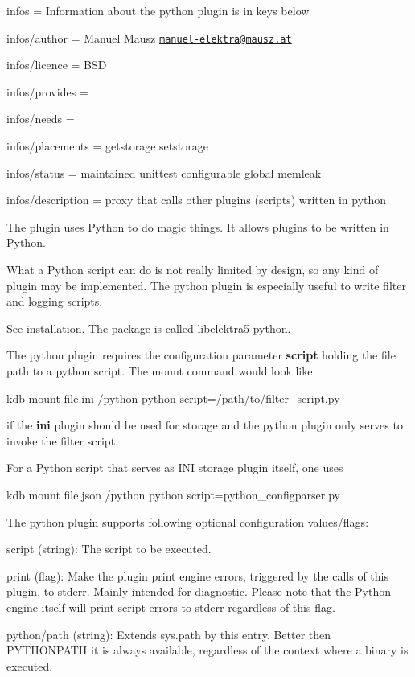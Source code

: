 
\begin{DoxyItemize}
\item infos = Information about the python plugin is in keys below
\item infos/author = Manuel Mausz \href{mailto:manuel-elektra@mausz.at}{\tt manuel-\/elektra@mausz.\+at}
\item infos/licence = B\+SD
\item infos/provides =
\item infos/needs =
\item infos/placements = getstorage setstorage
\item infos/status = maintained unittest configurable global memleak
\item infos/description = proxy that calls other plugins (scripts) written in python
\end{DoxyItemize}

The plugin uses Python to do magic things. It allows plugins to be written in Python.

What a Python script can do is not really limited by design, so any kind of plugin may be implemented. The python plugin is especially useful to write filter and logging scripts.

See \hyperlink{doc_INSTALL_md}{installation}. The package is called {\ttfamily libelektra5-\/python}.

The python plugin requires the configuration parameter {\bfseries script} holding the file path to a python script. The mount command would look like


\begin{DoxyCode}
kdb mount file.ini /python python script=/path/to/filter\_script.py
\end{DoxyCode}


if the {\bfseries ini} plugin should be used for storage and the python plugin only serves to invoke the filter script.

For a Python script that serves as I\+NI storage plugin itself, one uses


\begin{DoxyCode}
kdb mount file.json /python python script=python\_configparser.py
\end{DoxyCode}


The python plugin supports following optional configuration values/flags\+:


\begin{DoxyItemize}
\item {\ttfamily script} (string)\+: The script to be executed.
\item {\ttfamily print} (flag)\+: Make the plugin print engine errors, triggered by the calls of this plugin, to stderr. Mainly intended for diagnostic. Please note that the Python engine itself will print script errors to stderr regardless of this flag.
\item {\ttfamily python/path} (string)\+: Extends sys.\+path by this entry. Better then P\+Y\+T\+H\+O\+N\+P\+A\+TH it is always available, regardless of the context where a binary is executed.
\end{DoxyItemize}

